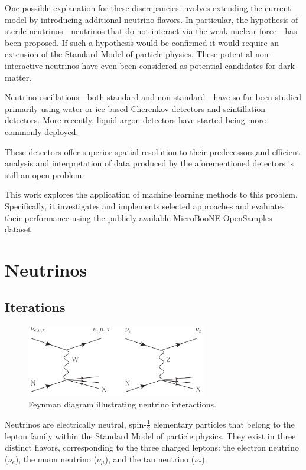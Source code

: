 \documentclass{pracalicmgr}
\begin{document}
One possible explanation for these discrepancies involves extending the current model by introducing additional neutrino flavors. In particular, the hypothesis of sterile neutrinos—neutrinos that do not interact via the weak nuclear force—has been proposed. If such a hypothesis would be confirmed it would require an extension of the Standard Model of particle physics. These potential non-interactive neutrinos have even been considered as potential candidates for dark matter\cite{neutrinoDarkMatter}.

Neutrino oscillations—both standard and non-standard—have so far been studied primarily using water or ice based Cherenkov detectors and scintillation detectors. More recently, liquid argon detectors have started being more commonly deployed.

These detectors offer superior spatial resolution to their predecessors,and efficient analysis and interpretation of data produced by the aforementioned detectors is still an open problem.

This work explores the application of machine learning methods to this problem. Specifically, it investigates and implements selected approaches and evaluates their performance using the publicly available MicroBooNE OpenSamples dataset.

\chapter{Neutrinos}

\section{Iterations}

\begin{figure}[h]
    \centering
    \includegraphics[width=0.7\textwidth]{src/xfig1_3nu.pdf}
    \caption{Feynman diagram illustrating neutrino interactions.\cite{neutrinoFeynmann}}
    \label{fig:Feynman_diagram_neutrino}
\end{figure}

Neutrinos are electrically neutral, spin-$\frac{1}{2}$ elementary particles that belong to the lepton family within the Standard Model of particle physics. They exist in three distinct flavors, corresponding to the three charged leptons: the electron neutrino ($\nu_e$), the muon neutrino ($\nu_\mu$), and the tau neutrino ($\nu_\tau$).\cite{neutrinoFeynmann}
\end{document}
